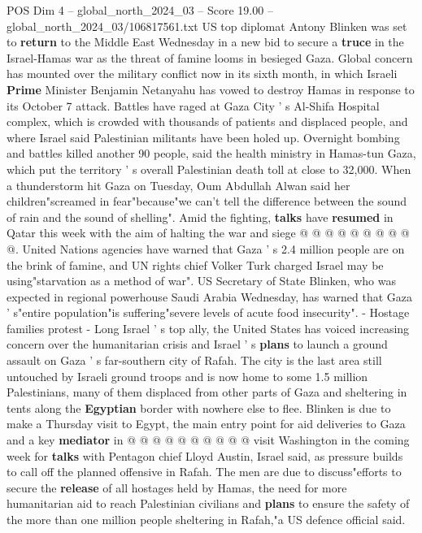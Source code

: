 \begin{textsample}{POS Dim 4 – global\_north\_2024\_03 – Score 19.00 – global\_north\_2024\_03/106817561.txt}  \label{ex:f4_pos_235}
US top diplomat Antony Blinken was set to \textbf{return} to the Middle East Wednesday in a new bid to secure a \textbf{truce} in the Israel-Hamas war as the threat of famine looms in besieged Gaza.
Global concern has mounted over the military conflict now in its sixth month, in which Israeli \textbf{Prime} Minister Benjamin Netanyahu has vowed to destroy Hamas in response to its October 7 attack.
Battles have raged at Gaza City ' s Al-Shifa Hospital complex, which is crowded with thousands of patients and displaced people, and where Israel said Palestinian militants have been holed up.
Overnight bombing and battles killed another 90 people, said the health ministry in Hamas-tun Gaza, which put the territory ' s overall Palestinian death toll at close to 32,000.
When a thunderstorm hit Gaza on Tuesday, Oum Abdullah Alwan said her children"screamed in fear"because"we can't tell the difference between the sound of rain and the sound of shelling".
Amid the fighting, \textbf{talks} have \textbf{resumed} in Qatar this week with the aim of halting the war and siege @ @ @ @ @ @ @ @ @ @.
United Nations agencies have warned that Gaza ' s 2.4 million people are on the brink of famine, and UN rights chief Volker Turk charged Israel may be using"starvation as a method of war".
US Secretary of State Blinken, who was expected in regional powerhouse Saudi Arabia Wednesday, has warned that Gaza ' s"entire population"is suffering"severe levels of acute food insecurity". - Hostage families protest - Long Israel ' s top ally, the United States has voiced increasing concern over the humanitarian crisis and Israel ' s \textbf{plans} to launch a ground assault on Gaza ' s far-southern city of Rafah.
The city is the last area still untouched by Israeli ground troops and is now home to some 1.5 million Palestinians, many of them displaced from other parts of Gaza and sheltering in tents along the \textbf{Egyptian} border with nowhere else to flee.
Blinken is due to make a Thursday visit to Egypt, the main entry point for aid deliveries to Gaza and a key \textbf{mediator} in @ @ @ @ @ @ @ @ @ @ visit Washington in the coming week for \textbf{talks} with Pentagon chief Lloyd Austin, Israel said, as pressure builds to call off the planned offensive in Rafah.
The men are due to discuss"efforts to secure the \textbf{release} of all hostages held by Hamas, the need for more humanitarian aid to reach Palestinian civilians and \textbf{plans} to ensure the safety of the more than one million people sheltering in Rafah,"a US defence official said.

\end{textsample}
